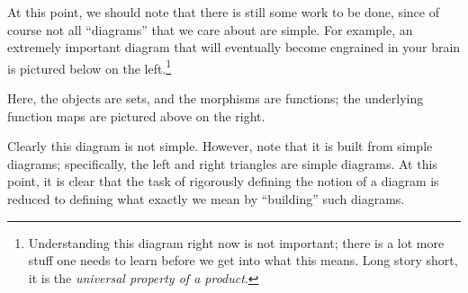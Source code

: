     At this point, we should note that there is still some work to be done, since 
    of course not all ``diagrams'' that we care about are simple. 
    For example, an extremely important diagram that will 
    eventually become engrained in your brain is pictured below on the left.\footnote{Understanding this diagram right now is not important; there is a lot 
    more stuff one needs to learn before we get into what this means. Long story short, 
    it is the \emph{universal property of a product}.}
    \begin{center}
        \hspace{1cm}
    \end{center}
    Here, the objects are sets, and the morphisms are functions; the underlying function 
    maps are pictured above on the right. 

    Clearly this diagram is not simple. However, note that it is built from simple 
    diagrams; specifically, the left and right triangles are simple diagrams. 
    At this point, it is clear that the task of rigorously defining the notion of  
    a diagram is reduced to defining what exactly we mean by ``building'' such 
    diagrams.

